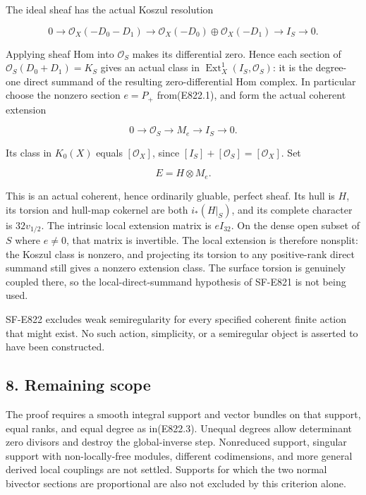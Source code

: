 The ideal sheaf has the actual Koszul resolution

\[
 0\to\mathcal O_X(-D_0-D_1)
       \to\mathcal O_X(-D_0)\oplus\mathcal O_X(-D_1)
       \to I_S\to0.
\]

Applying sheaf Hom into \(\mathcal O_S\) makes its differential zero.
Hence each section of \(\mathcal O_S(D_0+D_1)=K_S\) gives an actual
class in \(\operatorname{Ext}^1_X(I_S,\mathcal O_S)\): it is the
degree-one direct summand of the resulting zero-differential Hom
complex. In particular choose the nonzero section \(e=P_+\)
from(E822.1), and form the actual coherent extension

\[
 0\longrightarrow\mathcal O_S\longrightarrow M_e
      \longrightarrow I_S\longrightarrow0.
 \tag{E822.14}
\]

Its class in \(K_0(X)\) equals \([\mathcal O_X]\), since
\([I_S]+[\mathcal O_S]=[\mathcal O_X]\). Set

\[
 E=H\otimes M_e.
 \tag{E822.15}
\]

This is an actual coherent, hence ordinarily gluable, perfect sheaf. Its
hull is \(H\), its torsion and hull-map cokernel are both \(i_*(H|_S)\),
and its complete character is \(32v_{1/2}\). The intrinsic local
extension matrix is \(e I_{32}\). On the dense open subset of \(S\)
where \(e\ne0\), that matrix is invertible. The local extension is
therefore nonsplit: the Koszul class is nonzero, and projecting its
torsion to any positive-rank direct summand still gives a nonzero
extension class. The surface torsion is genuinely coupled there, so the
local-direct-summand hypothesis of SF-E821 is not being used.

SF-E822 excludes weak semiregularity for every specified coherent finite
action that might exist. No such action, simplicity, or a semiregular
object is asserted to have been constructed.

\subsection{8. Remaining scope}\label{SF-E822-remaining-scope}

The proof requires a smooth integral support and vector bundles on that
support, equal ranks, and equal degree as in(E822.3). Unequal degrees
allow determinant zero divisors and destroy the global-inverse step.
Nonreduced support, singular support with non-locally-free modules,
different codimensions, and more general derived local couplings are not
settled. Supports for which the two normal bivector sections are
proportional are also not excluded by this criterion alone.
